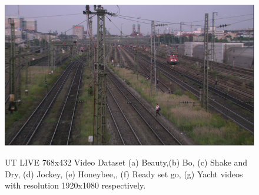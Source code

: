 \documentclass{book}
\begin{document}
\begin{figure}[bt!]
	{\includegraphics[width=1.4 true in]{pictures/ch7/UTLIVE_st.png}
		\label{fig:Class-L9}}	
	
	\caption{\label{fig:UTLIVE_Video_Databases}
		UT LIVE 768x432 Video Dataset  
		(a) Beauty,(b) Bo,
		(c) Shake and Dry, (d) Jockey, 
		(e) Honeybee,, (f) Ready set go, (g) Yacht videos with resolution 1920x1080 respectively.			}	
\end{figure}
\end{document}
